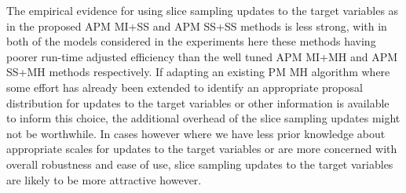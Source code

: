 The empirical evidence for using slice sampling updates to the target variables as in the proposed \ac{APM} \ac{MI}+\ac{SS} and \ac{APM} \ac{SS}+\ac{SS} methods is less strong, with in both of the models considered in the experiments here these methods having poorer run-time adjusted efficiency than the well tuned \ac{APM} \ac{MI}+\ac{MH} and \ac{APM} \ac{SS}+\ac{MH} methods respectively. If adapting an existing \ac{PM} \ac{MH} algorithm where some effort has already been extended to identify an appropriate proposal distribution for updates to the target variables or other information is available to inform this choice, the additional overhead of the slice sampling updates might not be worthwhile. In cases however where we have less prior knowledge about appropriate scales for updates to the target variables or are more concerned with overall robustness and ease of use, slice sampling updates to the target variables are likely to be more attractive however.




